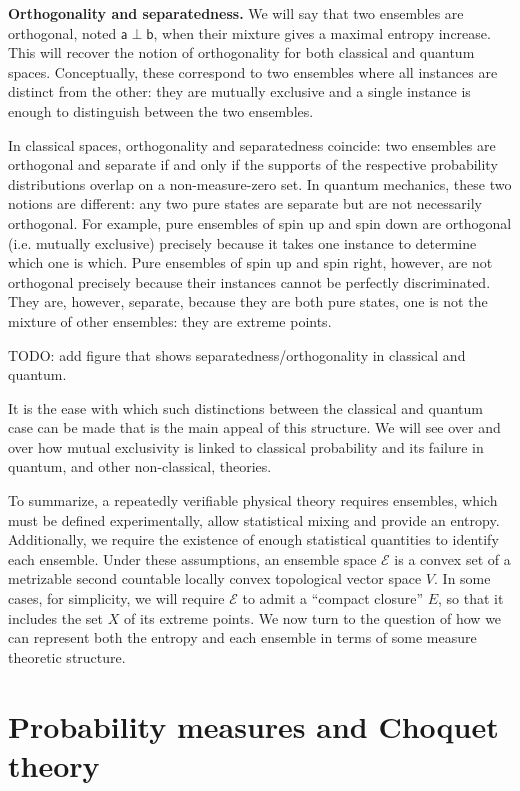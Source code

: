 \documentclass[10pt,twocolumn, nofootinbib]{revtex4-2}
\newcommand{\ens}[1][e] {\mathsf{#1}} %
\newcommand{\Ens}[1][E] {\mathcal{#1}} %
\def\ortho{\perp}
\begin{document}
\textbf{Orthogonality and separatedness.} We will say that two ensembles are orthogonal, noted $\ens[a] \ortho \ens[b]$, when their mixture gives a maximal entropy increase. This will recover the notion of orthogonality for both classical and quantum spaces. Conceptually, these correspond to two ensembles where all instances are distinct from the other: they are mutually exclusive and a single instance is enough to distinguish between the two ensembles. 

In classical spaces, orthogonality and separatedness coincide: two ensembles are orthogonal and separate if and only if the supports of the respective probability distributions overlap on a non-measure-zero set. In quantum mechanics, these two notions are different: any two pure states are separate but are not necessarily orthogonal. For example, pure ensembles of spin up and spin down are orthogonal (i.e. mutually exclusive) precisely because it takes one instance to determine which one is which. Pure ensembles of spin up and spin right, however, are not orthogonal precisely because their instances cannot be perfectly discriminated. They are, however, separate, because they are both pure states, one is not the mixture of other ensembles: they are extreme points.

TODO: add figure that shows separatedness/orthogonality in classical and quantum.

It is the ease with which such distinctions between the classical and quantum case can be made that is the main appeal of this structure. We will see over and over how mutual exclusivity is linked to classical probability and its failure in quantum, and other non-classical, theories.

To summarize, a repeatedly verifiable physical theory requires ensembles, which must be defined experimentally, allow statistical mixing and provide an entropy. Additionally, we require the existence of enough statistical quantities to identify each ensemble. Under these assumptions, an ensemble space $\Ens$ is a convex set of a metrizable second countable locally convex topological vector space $V$. In some cases, for simplicity, we will require $\Ens$ to admit a ``compact closure'' $E$, so that it includes the set $X$ of its extreme points. We now turn to the question of how we can represent both the entropy and each ensemble in terms of some measure theoretic structure.

\section{Probability measures and Choquet theory}
\end{document}
